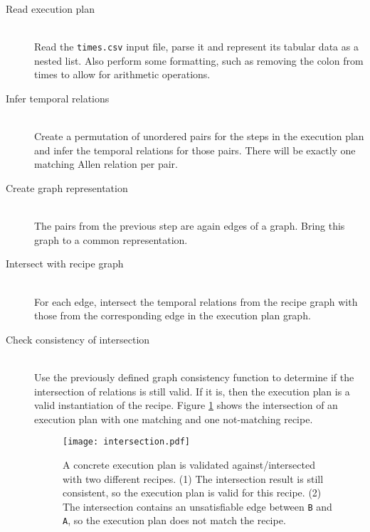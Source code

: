         \begin{description}
            \item[Read execution plan] \hfill \\
                Read the \texttt{times.csv} input file, parse it and represent
                its tabular data as a nested list. Also perform some formatting,
                such as removing the colon from times to allow for arithmetic
                operations.
            \item[Infer temporal relations] \hfill \\
                Create a permutation of unordered pairs for the steps in the
                execution plan and infer the temporal relations for those pairs.
                There will be exactly one matching Allen relation per pair.
            \item[Create graph representation] \hfill \\
                The pairs from the previous step are again edges of a graph.
                Bring this graph to a common representation.
            \item[Intersect with recipe graph] \hfill \\
                For each edge, intersect the temporal relations from the recipe
                graph with those from the corresponding edge in the execution
                plan graph.
            \item[Check consistency of intersection] \hfill \\
                Use the previously defined graph consistency function to
                determine if the intersection of relations is still valid. If it
                is, then the execution plan is a valid instantiation of the
                recipe. Figure \ref{fig:intersection} shows the intersection of
                an execution plan with one matching and one not-matching recipe.
    
                \begin{figure}[h]
                  \centering
                  \texttt{[image: intersection.pdf]}
                  \caption[Execution plan validation]{A concrete execution plan
                  is validated against/intersected with two different recipes.
                  (1) The intersection result is still consistent, so the
                  execution plan is valid for this recipe. (2) The intersection
                  contains an unsatisfiable edge between \texttt{B} and
                  \texttt{A}, so the execution plan does not match the recipe.}
                  \label{fig:intersection}
                \end{figure}
                
        \end{description}
    
